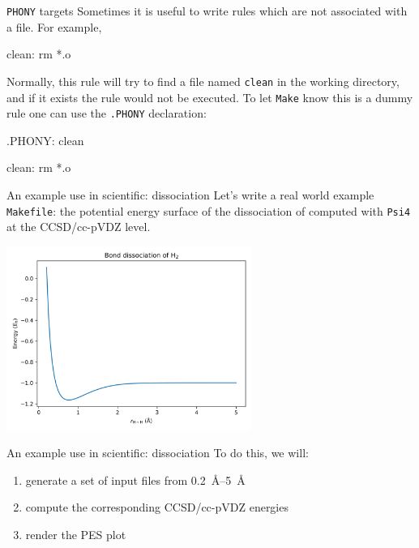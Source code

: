 \documentclass[10pt]{beamer}
\newcommand{\textco}[1]{\colorbox{bg_gray}{\texttt{#1}}}
\begin{document}
\begin{frame}[fragile]{\texttt{PHONY} targets}
  Sometimes it is useful to write rules which are not associated with a file.
  For example,
\begin{makefile}
clean:
    rm *.o
\end{makefile}
  Normally, this rule will try to find a file named \textco{clean} in the
  working directory, and if it exists the rule would not be executed. To let
  \textco{Make} know this is a dummy rule one can use the \textco{.PHONY} declaration:
\begin{makefile}
.PHONY: clean

clean:
    rm *.o
\end{makefile}
\end{frame}


\begin{frame}[fragile]{An example use in scientific:  dissociation}
  Let's write a real world example \textco{Makefile}: the potential energy surface
  of the dissociation of  computed with \texttt{Psi4} at the CCSD/cc-pVDZ level.
  \begin{center}
    \includegraphics[width=8cm]{h2_dissociation.png}
  \end{center}
\end{frame}

\begin{frame}[fragile]{An example use in scientific:  dissociation}
  To do this, we will:
  \begin{enumerate}
    \item generate a set of input files from \SIrange{0.2}{5}{\angstrom}
    \item compute the corresponding CCSD/cc-pVDZ energies
    \item render the PES plot
  \end{enumerate}
  \pause
  \begin{center}
\end{center}
\end{frame}
\end{document}
